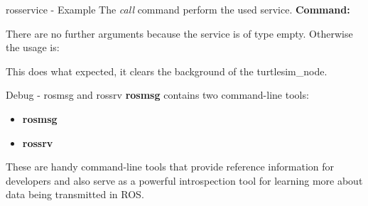 \documentclass{beamer}
\begin{document}
\begin{frame}{rosservice - Example}
The \textit{call} command perform the used service.
\textbf{Command:} 

There are no further arguments because the service is of type empty.
\newline
Otherwise the usage is:

This does what expected, it clears the background of the turtlesim\_node.
\begin{figure}[h]\centering
\end{figure}
\end{frame}
\begin{frame}{Debug - rosmsg and rossrv}
	\textbf{rosmsg} contains two command-line tools:
	\begin{itemize}
		\item \textbf{rosmsg}
		\item \textbf{rossrv}
	\end{itemize}
	These are handy command-line tools that provide reference information for developers and also serve as a powerful introspection tool for learning more about data being transmitted in ROS.
\end{frame}
\end{document}
